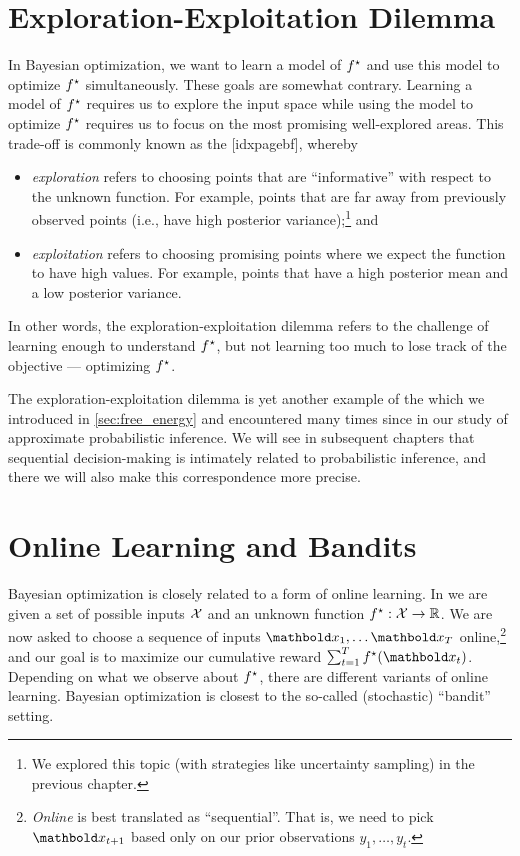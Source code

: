 \section{Exploration-Exploitation Dilemma}\label{sec:bayesian_optimization:exploration_exploitation}

In Bayesian optimization, we want to learn a model of $f^\star$ and use this model to optimize $f^\star$ simultaneously.
These goals are somewhat contrary.
Learning a model of $f^\star$ requires us to explore the input space while using the model to optimize $f^\star$ requires us to focus on the most promising well-explored areas.
This trade-off is commonly known as the [idxpagebf], whereby \begin{itemize}
  \item \emph{exploration} refers to choosing points that are ``informative'' with respect to the unknown function. For example, points that are far away from previously observed points (i.e., have high posterior variance);\footnote{We explored this topic (with strategies like uncertainty sampling) in the previous chapter.} and
  \item \emph{exploitation} refers to choosing promising points where we expect the function to have high values. For example, points that have a high posterior mean and a low posterior variance.
\end{itemize}
In other words, the exploration-exploitation dilemma refers to the challenge of learning enough to understand $f^\star$, but not learning too much to lose track of the objective --- optimizing $f^\star$.

The exploration-exploitation dilemma is yet another example of the  which we introduced in \cref{sec:free_energy} and encountered many times since in our study of approximate probabilistic inference.
We will see in subsequent chapters that sequential decision-making is intimately related to probabilistic inference, and there we will also make this correspondence more precise.

\section{Online Learning and Bandits}

Bayesian optimization is closely related to a form of online learning.
In  we are given a set of possible inputs $\mathcal{X}$ and an unknown function $f^\star : \mathcal{X} \to \mathbb{R}$.
We are now asked to choose a sequence of inputs $\vx_1, \dots \vx_T$ online,\footnote{\emph{Online} is best translated as ``sequential''. That is, we need to pick $\vx_{t+1}$ based only on our prior observations $y_1, \dots, y_t$.} and our goal is to maximize our cumulative reward $\sum_{t=1}^T \opt{f}(\vx_t)$.
Depending on what we observe about $f^\star$, there are different variants of online learning.
Bayesian optimization is closest to the so-called (stochastic) ``bandit'' setting.

